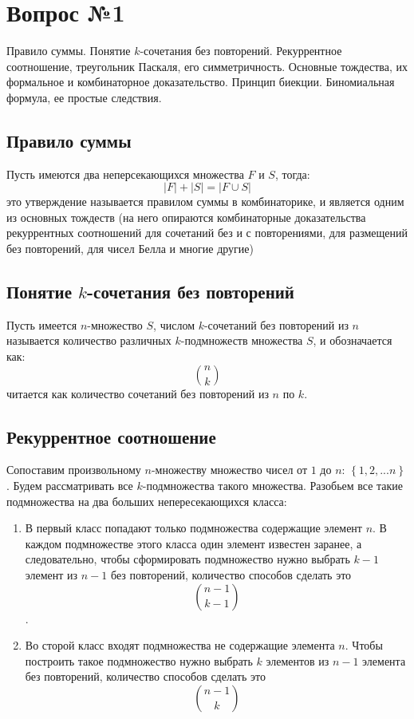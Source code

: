 \chapter{Вопрос №1}

Правило суммы. Понятие $k$-сочетания без повторений. Рекуррентное соотношение, треугольник Паскаля, его симметричность. Основные тождества, их формальное и комбинаторное доказательство. Принцип биекции. Биномиальная формула, ее простые следствия.

\section{Правило суммы}

Пусть имеются два неперсекающихся множества $F$ и $S$, тогда:
\begin{equation}
	\left|F\right| + \left|S\right| = \left|F \cup S\right|
\end{equation}
это утверждение называется правилом суммы в комбинаторике, и является одним из основных тождеств (на него опираются комбинаторные доказательства рекуррентных соотношений для сочетаний без и с повторениями, для размещений без повторений, для чисел Белла и многие другие)

\section{Понятие $k$-сочетания без повторений}

Пусть имеется $n$-множество $S$, числом $k$-сочетаний без повторений из $n$ называется количество различных $k$-подмножеств множества $S$, и обозначается как:
\[
	\binom{n}{k}
\]
читается как количество сочетаний без повторений из $n$ по $k$.

\section{Рекуррентное соотношение}

Сопоставим произвольному $n$-множеству множество чисел от $1$ до $n$: $\left\{1, 2, ... n\right\}$. Будем рассматривать все $k$-подмножества такого множества. Разобьем все такие подмножества на два больших непересекающихся класса:
\begin{enumerate}
\item В первый класс попадают только подмножества содержащие элемент $n$. В каждом подмножестве этого класса один элемент известен заранее, а следовательно, чтобы сформировать подмножество нужно выбрать $k-1$ элемент из $n-1$ без повторений, количество способов сделать это $$ \binom{n-1}{k-1} $$.

\item Во сторой класс входят подмножества не содержащие элемента $n$. Чтобы построить такое подмножество нужно выбрать $k$ элементов из $n-1$ элемента без повторений, количество способов сделать это $$ \binom{n-1}{k} $$
\end{enumerate}

